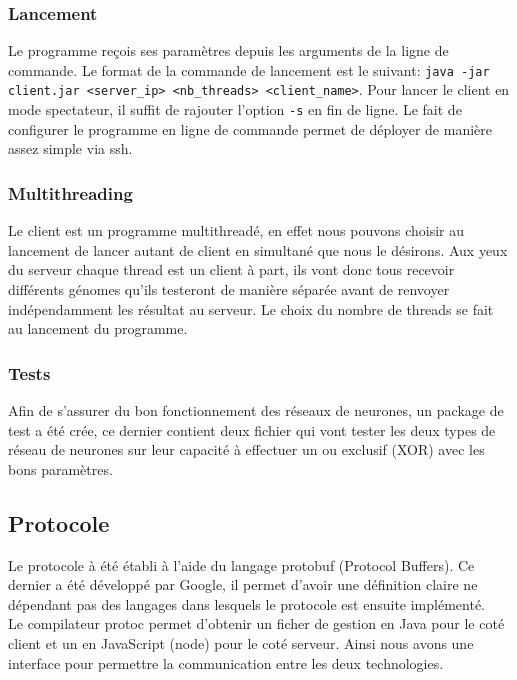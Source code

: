 \documentclass{article}
\begin{document}
\subsubsection{Lancement}

Le programme reçois ses paramètres depuis les arguments de la ligne de commande. Le format de la commande de lancement est le suivant: \texttt{java -jar client.jar <server\_ip> <nb\_threads> <client\_name>}. Pour lancer le client en mode spectateur, il suffit de rajouter l'option \texttt{-s} en fin de ligne. Le fait de configurer le programme en ligne de commande permet de déployer de manière assez simple via ssh.  

\subsubsection{Multithreading}

Le client est un programme multithreadé, en effet nous pouvons choisir au lancement de lancer autant de client en simultané que nous le désirons. Aux yeux du serveur chaque thread est un client à part, ils vont donc tous recevoir différents génomes qu'ils testeront de manière séparée avant de renvoyer indépendamment les résultat au serveur. Le choix du nombre de threads se fait au lancement du programme.

\subsubsection{Tests}

Afin de s'assurer du bon fonctionnement des réseaux de neurones, un package de test a été crée, ce dernier contient deux fichier qui vont tester les deux types de réseau de neurones sur leur capacité à effectuer un ou exclusif (XOR) avec les bons paramètres.

\subsection{Protocole}

Le protocole à été établi à l'aide du langage protobuf (Protocol Buffers). Ce dernier a été développé par Google, il permet d'avoir une définition claire ne dépendant pas des langages dans lesquels le protocole est ensuite implémenté.\\

Le compilateur protoc permet d'obtenir un ficher de gestion en Java pour le coté client et un en JavaScript (node) pour le coté serveur. Ainsi nous avons une interface pour permettre la communication entre les deux technologies.\\
\end{document}
